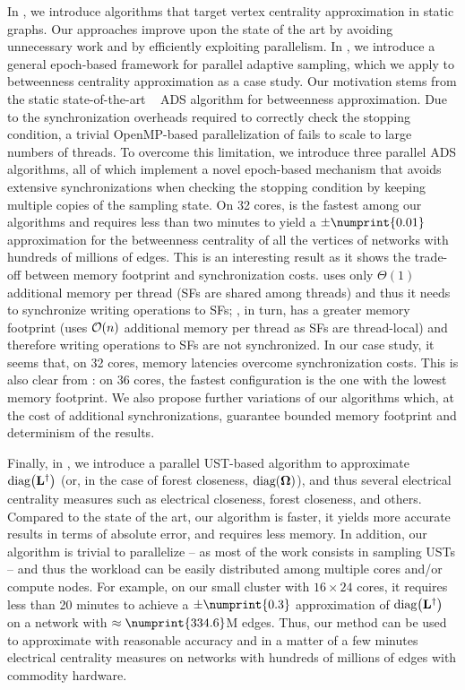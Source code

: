 In , we introduce
algorithms that target vertex centrality approximation in static graphs. Our
approaches improve upon the state of the art by avoiding unnecessary work
and by efficiently exploiting parallelism.
In , we
introduce a general epoch-based framework for parallel adaptive sampling, which
we apply to betweenness centrality approximation as a case study.
Our motivation stems from the static state-of-the-art
\kadabra~\cite{DBLP:conf/esa/BorassiN16} ADS algorithm for betweenness
approximation. Due to the synchronization overheads required to correctly
check the stopping condition, a trivial OpenMP-based parallelization of
\kadabra fails to scale to large numbers of threads.
%
To overcome this limitation, we introduce three parallel ADS algorithms,
all of which implement a novel epoch-based mechanism that avoids extensive
synchronizations when checking the stopping condition by keeping multiple
copies of the sampling state.
On 32 cores, \sharedframe is the fastest among our algorithms
and requires less than two minutes to
yield a $\pm\numprint{0.01}$ approximation for the betweenness
centrality of all the vertices of networks with hundreds of millions of edges.
This is an interesting result as it shows the trade-off between memory footprint
and synchronization costs.
\Sharedframe uses only $\Theta(1)$ additional memory
per thread (SFs are shared among threads) and thus it needs to synchronize
writing operations to SFs; \localframe, in turn, has a greater memory footprint
(uses
$\mathcal{O}(n)$ additional memory per thread as SFs are thread-local) and
therefore writing operations to SFs are not synchronized.
In our case study, it seems that, on 32 cores, memory latencies overcome synchronization
costs. This is also clear from : on 36 cores,
the fastest \sharedframe configuration is the one with the lowest memory footprint.
We also propose further variations of our algorithms which, at the cost of
additional synchronizations, guarantee bounded memory footprint and determinism
of the results.

Finally, in , we introduce a parallel
UST-based algorithm to approximate $\diag{\Linv}$ (or, in the case of
forest closeness, $\diag{\Fmat}$), and thus several electrical centrality
measures such as electrical closeness, forest closeness, and others.
Compared to the state of the art, our algorithm is faster, it yields more
accurate results in terms of absolute error, and requires less memory.
In addition, our algorithm is trivial to parallelize -- as most of the work
consists in sampling USTs -- and thus the workload can be easily distributed
among multiple cores and/or compute nodes.
For example, on our small cluster with $16\times24$ cores, it requires
less than 20 minutes to achieve a $\pm\numprint{0.3}$ approximation of
$\diag{\Linv}$ on a network with $\approx\numprint{334.6}$M edges.
Thus, our method can be used to approximate with reasonable accuracy and in a
matter of a few minutes electrical centrality measures on networks with
hundreds of millions of edges with commodity hardware.

